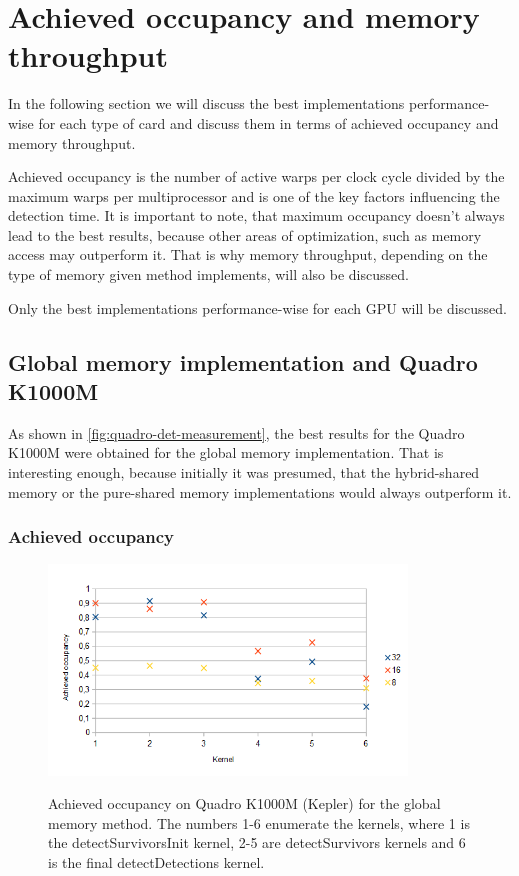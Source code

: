 \section{Achieved occupancy and memory throughput}

In the following section we will discuss the best implementations performance-wise for each type of card and discuss them in terms of achieved occupancy and memory throughput.

Achieved occupancy is the number of active warps per clock cycle divided by the maximum warps per multiprocessor and is one of the key factors influencing the detection time. It is important to note, that maximum occupancy doesn't always lead to the best results, because other areas of optimization, such as memory access may outperform it. That is why memory throughput, depending on the type of memory given method implements, will also be discussed.

Only the best implementations performance-wise for each GPU will be discussed.

\subsection{Global memory implementation and Quadro K1000M}

As shown in \ref{fig:quadro-det-measurement}, the best results for the Quadro K1000M were obtained for the global memory implementation. That is interesting enough, because initially it was presumed, that the hybrid-shared memory or the pure-shared memory implementations would always outperform it.

\subsubsection{Achieved occupancy}

\begin{center}
\begin{figure}[h]
	\centering\includegraphics[width=0.85\textwidth]{fig/achievedoc_quadro.png}\label{fig:occupancy-quadro}
	\caption{Achieved occupancy on Quadro K1000M (Kepler) for the global memory method. The numbers 1-6 enumerate the kernels, where 1 is the detectSurvivorsInit kernel, 2-5 are detectSurvivors kernels and 6 is the final detectDetections kernel.}
\end{figure}
\end{center}


